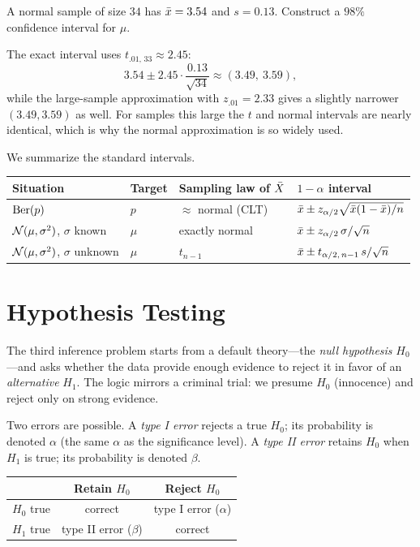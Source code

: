 \begin{example}
A normal sample of size $34$ has $\bar{x}=3.54$ and $s=0.13$. Construct a $98\%$
confidence interval for $\mu$.

\solution The exact interval uses $t_{.01,\,33}\approx 2.45$:
\[
  3.54\pm 2.45\cdot\frac{0.13}{\sqrt{34}}\approx(3.49,\ 3.59),
\]
while the large-sample approximation with $z_{.01}=2.33$ gives a slightly
narrower $(3.49,3.59)$ as well. For samples this large the $t$ and normal
intervals are nearly identical, which is why the normal approximation is so
widely used.
\end{example}

We summarize the standard intervals.

\begin{center}
\renewcommand{\arraystretch}{1.3}
\begin{tabular}{@{}llll@{}}
\toprule
Situation & Target & Sampling law of $\bar{X}$ & $1-\alpha$ interval\\
\midrule
$\mathrm{Ber}(p)$ & $p$ & $\approx$ normal (CLT) & $\bar{x}\pm z_{\alpha/2}\sqrt{\bar{x}(1-\bar{x})/n}$\\
$\mathcal{N}(\mu,\sigma^2)$, $\sigma$ known & $\mu$ & exactly normal & $\bar{x}\pm z_{\alpha/2}\,\sigma/\sqrt n$\\
$\mathcal{N}(\mu,\sigma^2)$, $\sigma$ unknown & $\mu$ & $t_{n-1}$ & $\bar{x}\pm t_{\alpha/2,\,n-1}\,s/\sqrt n$\\
\bottomrule
\end{tabular}
\end{center}

\section{Hypothesis Testing}

The third inference problem starts from a default theory—the \emph{null
hypothesis} $H_0$—and asks whether the data provide enough evidence to reject it
in favor of an \emph{alternative} $H_1$. The logic mirrors a criminal trial: we
presume $H_0$ (innocence) and reject only on strong evidence.

Two errors are possible. A \emph{type I error} rejects a true $H_0$; its
probability is denoted $\alpha$ (the same $\alpha$ as the significance level). A
\emph{type II error} retains $H_0$ when $H_1$ is true; its probability is denoted
$\beta$.

\begin{center}
\renewcommand{\arraystretch}{1.3}
\begin{tabular}{@{}lcc@{}}
\toprule
 & Retain $H_0$ & Reject $H_0$\\
\midrule
$H_0$ true & correct & type I error ($\alpha$)\\
$H_1$ true & type II error ($\beta$) & correct\\
\bottomrule
\end{tabular}
\end{center}

